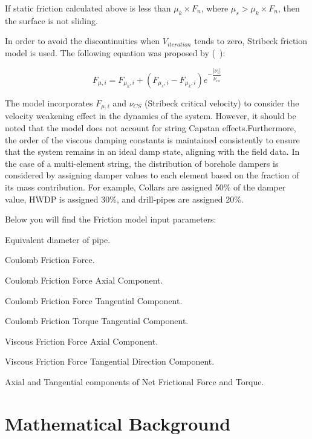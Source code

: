 If static friction calculated above is less than $\mu_{k}\times F_{n}$, where $\mu_{s} > \mu_{k}\times F_{n}$, then the surface is not sliding.

In order to avoid the discontinuities when $V_{iteration}$ tends to zero, Stribeck friction model is used. The following equation was proposed by (~\cite{ref:tustin1947a}):

\begin{equation}\label{Stribeck velocity}
  F_{\mu,i} = F_{\mu_{k},i} + (F_{\mu_{s},i} - F_{\mu_{k},i})e^{-\dfrac{|\nu_{i}|}{\nu_{cs}}}
\end{equation} 

The model incorporates $F_{\mu,i}$ and $\nu_{CS}$ (Stribeck critical velocity) to consider the velocity weakening effect in the dynamics of the system. However, it should be noted that the model does not account for string Capstan effects.Furthermore, the order of the viscous damping constants is maintained consistently to ensure that the system remains in an ideal damp state, aligning with the field data. In the case of a multi-element string, the distribution of borehole dampers is considered by assigning damper values to each element based on the fraction of its mass contribution. For example, Collars are assigned 50\% of the damper value, HWDP is assigned 30\%, and drill-pipes are assigned 20\%. 

Below you will find the Friction model input parameters:
\begin{bulletedlist}
    \item Equivalent diameter of pipe.
    \item Coulomb Friction Force.
    \item Coulomb Friction Force Axial Component.
    \item Coulomb Friction Force Tangential Component.
    \item Coulomb Friction Torque Tangential Component.
    \item Viscous Friction Force Axial Component.
    \item Viscous Friction Force Tangential Direction Component.
    \item Axial and Tangential components of Net Frictional Force and Torque.
\end{bulletedlist}

\section{Mathematical Background}

